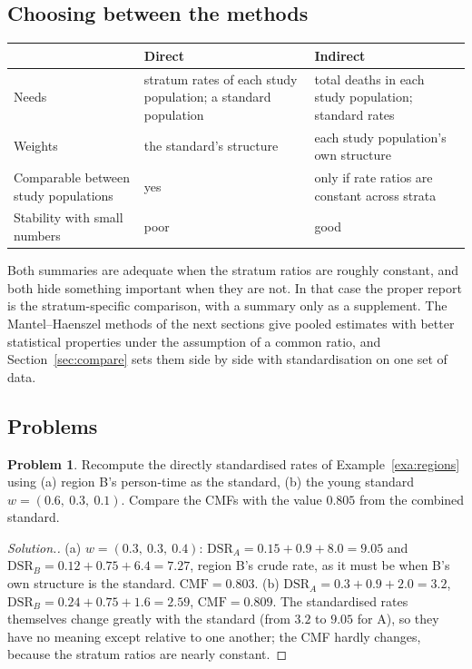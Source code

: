 \documentclass[11pt,a4paper]{article}
\numberwithin{equation}{section}
\theoremstyle{definition}
\newtheorem{problemx}{Problem}[subsection]
\newenvironment{problem}{\begin{problemx}}{\end{problemx}}
\newenvironment{solution}
  {\renewcommand{\qedsymbol}{}\begin{proof}[\textit{Solution}.]}
  {\end{proof}}
\begin{document}
\subsection{Choosing between the methods}

\begin{center}
\begin{tabular}{p{3.4cm}p{5.5cm}p{5.5cm}}
\hline
 & Direct & Indirect \\
\hline
Needs & stratum rates of each study population; a standard population & total deaths in each study population; standard rates \\
Weights & the standard's structure & each study population's own structure \\
Comparable between study populations & yes & only if rate ratios are constant across strata \\
Stability with small numbers & poor & good \\
\hline
\end{tabular}
\end{center}
Both summaries are adequate when the stratum ratios are roughly constant, and both hide something important when they are not. In
that case the proper report is the stratum-specific comparison, with a summary only as a supplement. The Mantel--Haenszel methods of
the next sections give pooled estimates with better statistical properties under the assumption of a common ratio, and Section~\ref{sec:compare}
sets them side by side with standardisation on one set of data.

\subsection{Problems}

\begin{problem}
Recompute the directly standardised rates of Example~\ref{exa:regions} using (a) region B's person-time as the standard, (b) the young
standard $w = (0.6,\ 0.3,\ 0.1)$. Compare the CMFs with the value $0.805$ from the combined standard.
\end{problem}

\begin{solution}
(a) $w = (0.3,\ 0.3,\ 0.4)$: $\text{DSR}_A = 0.15 + 0.9 + 8.0 = 9.05$ and $\text{DSR}_B = 0.12 + 0.75 + 6.4 = 7.27$, region B's crude rate, as it must be when B's own
structure is the standard. $\text{CMF} = 0.803$. (b) $\text{DSR}_A = 0.3 + 0.9 + 2.0 = 3.2$, $\text{DSR}_B = 0.24 + 0.75 + 1.6 = 2.59$, $\text{CMF} = 0.809$. The standardised
rates themselves change greatly with the standard (from $3.2$ to $9.05$ for A), so they have no meaning except relative to one another;
the CMF hardly changes, because the stratum ratios are nearly constant.
\end{solution}
\end{document}
